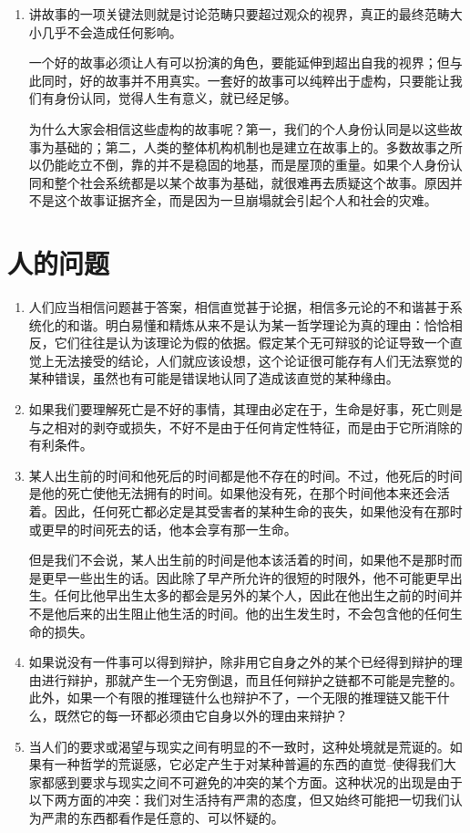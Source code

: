 \documentclass[UTF8]{ctexart}
\begin{document}
\begin{enumerate}
			\item 讲故事的一项关键法则就是讨论范畴只要超过观众的视界，真正的最终范畴大小几乎不会造成任何影响。
			
			一个好的故事必须让人有可以扮演的角色，要能延伸到超出自我的视界；但与此同时，好的故事并不用真实。一套好的故事可以纯粹出于虚构，只要能让我们有身份认同，觉得人生有意义，就已经足够。
			
			为什么大家会相信这些虚构的故事呢？第一，我们的个人身份认同是以这些故事为基础的；第二，人类的整体机构机制也是建立在故事上的。多数故事之所以仍能屹立不倒，靠的并不是稳固的地基，而是屋顶的重量。如果个人身份认同和整个社会系统都是以某个故事为基础，就很难再去质疑这个故事。原因并不是这个故事证据齐全，而是因为一旦崩塌就会引起个人和社会的灾难。
		\end{enumerate}
	\newpage
	
	\section{人的问题}
		
		\begin{enumerate}
			\item  人们应当相信问题甚于答案，相信直觉甚于论据，相信多元论的不和谐甚于系统化的和谐。明白易懂和精炼从来不是认为某一哲学理论为真的理由：恰恰相反，它们往往是认为该理论为假的依据。假定某个无可辩驳的论证导致一个直觉上无法接受的结论，人们就应该设想，这个论证很可能存有人们无法察觉的某种错误，虽然也有可能是错误地认同了造成该直觉的某种缘由。
			
			\item 如果我们要理解死亡是不好的事情，其理由必定在于，生命是好事，死亡则是与之相对的剥夺或损失，不好不是由于任何肯定性特征，而是由于它所消除的有利条件。
			
			\item 某人出生前的时间和他死后的时间都是他不存在的时间。不过，他死后的时间是他的死亡使他无法拥有的时间。如果他没有死，在那个时间他本来还会活着。因此，任何死亡都必定是其受害者的某种生命的丧失，如果他没有在那时或更早的时间死去的话，他本会享有那一生命。
			
			但是我们不会说，某人出生前的时间是他本该活着的时间，如果他不是那时而是更早一些出生的话。因此除了早产所允许的很短的时限外，他不可能更早出生。任何比他早出生太多的都会是另外的某个人，因此在他出生之前的时间并不是他后来的出生阻止他生活的时间。他的出生发生时，不会包含他的任何生命的损失。
			
			\item 如果说没有一件事可以得到辩护，除非用它自身之外的某个已经得到辩护的理由进行辩护，那就产生一个无穷倒退，而且任何辩护之链都不可能是完整的。此外，如果一个有限的推理链什么也辩护不了，一个无限的推理链又能干什么，既然它的每一环都必须由它自身以外的理由来辩护？
			
			\item 当人们的要求或渴望与现实之间有明显的不一致时，这种处境就是荒诞的。如果有一种哲学的荒诞感，它必定产生于对某种普遍的东西的直觉--使得我们大家都感到要求与现实之间不可避免的冲突的某个方面。这种状况的出现是由于以下两方面的冲突：我们对生活持有严肃的态度，但又始终可能把一切我们认为严肃的东西都看作是任意的、可以怀疑的。
		\end{enumerate}
	
\end{document}
